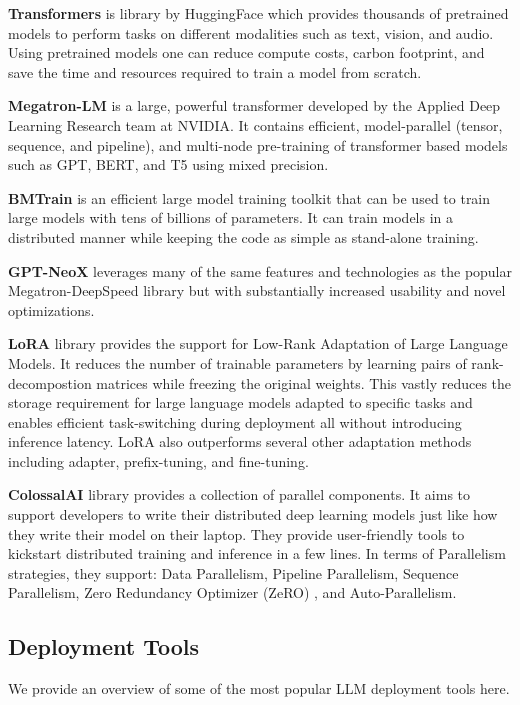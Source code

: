 \documentclass[conference]{IEEEtran}
\begin{document}
\textbf{Transformers}
\cite{transformers} is library by HuggingFace which provides thousands of pretrained models to perform tasks on different modalities such as text, vision, and audio. Using pretrained models one can reduce compute costs, carbon footprint, and save the time and resources required to train a model from scratch.


\textbf{Megatron-LM}
\cite{MegatronLM} is a large, powerful transformer developed by the Applied Deep Learning Research team at NVIDIA.
It contains efficient, model-parallel (tensor, sequence, and pipeline), and multi-node pre-training of transformer based models such as GPT, BERT, and T5 using mixed precision.


\textbf{BMTrain}
\cite{BMTrain} is an efficient large model training toolkit that can be used to train large models with tens of billions of parameters. It can train models in a distributed manner while keeping the code as simple as stand-alone training.


\textbf{GPT-NeoX}
\cite{gpt-neox} leverages many of the same features and technologies as the popular Megatron-DeepSpeed library but with substantially increased usability and novel optimizations.


\textbf{LoRA}
\cite{lora} library provides the support for Low-Rank Adaptation of Large Language Models. It reduces the number of trainable parameters by learning pairs of rank-decompostion matrices while freezing the original weights. This vastly reduces the storage requirement for large language models adapted to specific tasks and enables efficient task-switching during deployment all without introducing inference latency. LoRA also outperforms several other adaptation methods including adapter, prefix-tuning, and fine-tuning.

\textbf{ColossalAI}
library \cite{ColossalAI} provides a collection of parallel components. It aims to support developers to write their distributed deep learning models just like how they write their model on their laptop. They provide user-friendly tools to kickstart distributed training and inference in a few lines.
In terms of Parallelism strategies, they support: Data Parallelism, Pipeline Parallelism, Sequence Parallelism, Zero Redundancy Optimizer (ZeRO) \cite{rajbhandari2020zero}, and Auto-Parallelism.


\subsection{Deployment Tools}
We provide an overview of some of the most popular LLM deployment tools here.
\end{document}
